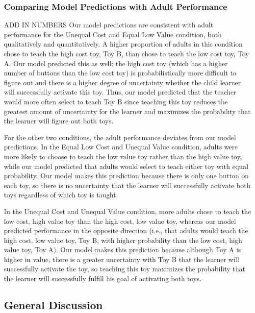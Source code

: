 \documentclass[10pt,letterpaper]{article}
\begin{document}
\subsubsection{Comparing Model Predictions with Adult Performance}
ADD IN NUMBERS
Our model predictions are consistent with adult performance for the Unequal Cost and Equal Low Value condition, both qualitatively and quantitatively. A higher proportion of adults in this condition chose to teach the high cost toy, Toy B, than chose to teach the low cost toy, Toy A. Our model predicted this as well: the high cost toy (which has a higher number of buttons than the low cost toy) is probabilistically more difficult to figure out and there is a higher degree of uncertainty whether the child learner will successfully activate this toy. Thus, our model predicted that the teacher would more often select to teach Toy B since teaching this toy reduces the greatest amount of uncertainty for the learner and maximizes the probability that the learner will figure out both toys. 

For the other two conditions, the adult performance deviates from our model predictions. In the Equal Low Cost and Unequal Value condition, adults were more likely to choose to teach the low value toy rather than the high value toy, while our model predicted that adults would select to teach either toy with equal probability. Our model makes this prediction because there is only one button on each toy, so there is no uncertainty that the learner will successfully activate both toys regardless of which toy is taught.

In the Unequal Cost and Unequal Value condition, more adults chose to teach the low cost, high value toy than the high cost, low value toy, whereas our model predicted performance in the opposite direction (i.e., that adults would teach the high cost, low value toy, Toy B, with higher probability than the low cost, high value toy, Toy A). Our model makes this prediction because although Toy A is higher in value, there is a greater uncertainty with Toy B that the learner will successfully activate the toy, so teaching this toy maximizes the probability that the learner will successfully fulfill his goal of activating both toys.

\subsection{General Discussion}
\end{document}

